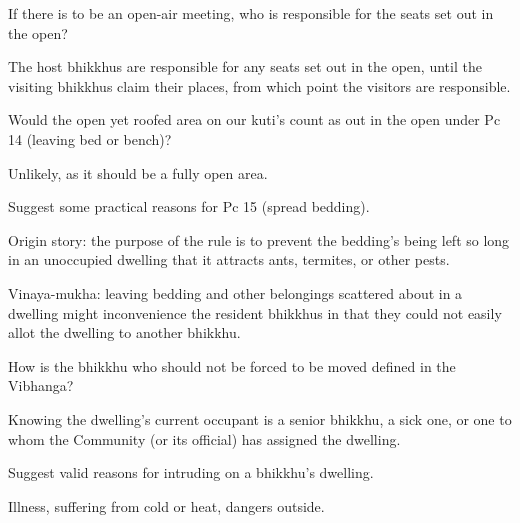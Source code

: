 \bigskip

If there is to be an open-air meeting, who is responsible for the seats set out
in the open?

\begin{solution}
  The host bhikkhus are responsible for any seats set out in the open, until the
  visiting bhikkhus claim their places, from which point the visitors are
  responsible.
\end{solution}

\bigskip

Would the open yet roofed area on our kuti’s count as out in the open under Pc 14 (leaving bed or bench)?

\begin{solution}
  Unlikely, as it should be a fully open area.
\end{solution}

\bigskip


Suggest some practical reasons for Pc 15 (spread bedding).

\begin{solution}
  Origin story: the purpose of the rule is to prevent the bedding’s being left
  so long in an unoccupied dwelling that it attracts ants, termites, or other
  pests.

  Vinaya-mukha: leaving bedding and other belongings scattered about in a
  dwelling might inconvenience the resident bhikkhus in that they could not
  easily allot the dwelling to another bhikkhu.
\end{solution}

\bigskip


How is the bhikkhu who should not be forced to be moved defined in the Vibhanga?

\begin{solution}
  Knowing the dwelling’s current occupant is a senior bhikkhu, a sick one, or
  one to whom the Community (or its official) has assigned the dwelling.
\end{solution}

\bigskip

Suggest valid reasons for intruding on a bhikkhu’s dwelling.

\begin{solution}
  Illness, suffering from cold or heat, dangers outside.
\end{solution}

